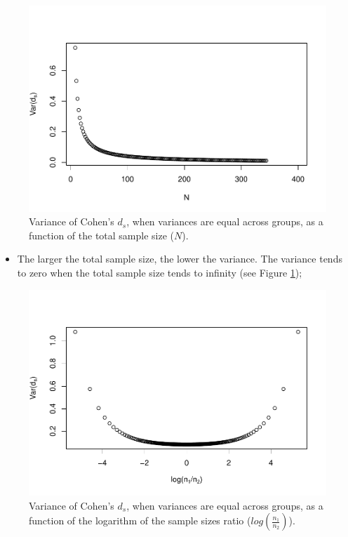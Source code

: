 \documentclass[
  english,
  man,mask]{apa6}
\providecommand{\tightlist}{%
  \setlength{\itemsep}{0pt}\setlength{\parskip}{0pt}}
\begin{document}
\begin{figure}
\centering
\includegraphics{Theoretical-Variance-of-all-estimators-as-a-function-of-population-parameters_files/figure-latex/varcohendNsize2-1.pdf}
\caption{\label{fig:varcohendNsize2}Variance of Cohen's \(d_s\), when variances are equal across groups, as a function of the total sample size (\(N\)).}
\end{figure}

\begin{itemize}
\tightlist
\item
  The larger the total sample size, the lower the variance. The variance tends to zero when the total sample size tends to infinity (see Figure \ref{fig:varcohendNsize2});
\end{itemize}

\begin{figure}
\centering
\includegraphics{Theoretical-Variance-of-all-estimators-as-a-function-of-population-parameters_files/figure-latex/varcohenNratio2-1.pdf}
\caption{\label{fig:varcohenNratio2}Variance of Cohen's \(d_s\), when variances are equal across groups, as a function of the logarithm of the sample sizes ratio (\(log\left(\frac{n_1}{n_2} \right)\)).}
\end{figure}
\end{document}
